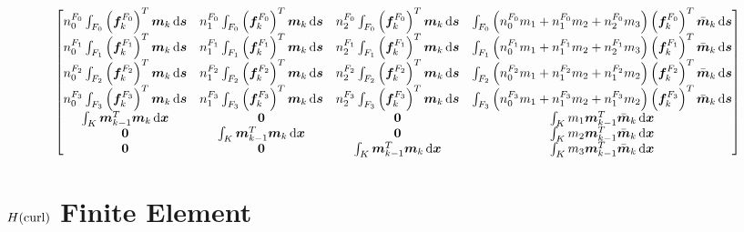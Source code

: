 \documentclass{article}
\begin{document}
\begin{align*}
    \begin{bmatrix}
        n_{0}^{F_0} \int_{F_0} \left({\boldsymbol f}_{k}^{F_0}\right)^T{\boldsymbol m}_{k}\,\mathrm d{\boldsymbol s} & 
        n_{1}^{F_0} \int_{F_0} \left({\boldsymbol f}_{k}^{F_0}\right)^T{\boldsymbol m}_{k}\,\mathrm d{\boldsymbol s} & 
        n_{2}^{F_0} \int_{F_0} \left({\boldsymbol f}_{k}^{F_0}\right)^T{\boldsymbol m}_{k}\,\mathrm d{\boldsymbol s} & 
        \int_{F_0} 
        \left(n_{0}^{F_0}m_1 + n_{1}^{F_0} m_2 + n_{2}^{F_0} m_3\right)
        \left({\boldsymbol f}_{k}^{F_0}\right)^T\bar{{\boldsymbol m}}_{k}\,\mathrm d{\boldsymbol s} \\ 
        n_{0}^{F_1} \int_{F_1} \left({\boldsymbol f}_{k}^{F_1}\right)^T{\boldsymbol m}_{k}\,\mathrm d{\boldsymbol s} & 
        n_{1}^{F_1} \int_{F_1} \left({\boldsymbol f}_{k}^{F_1}\right)^T{\boldsymbol m}_{k}\,\mathrm d{\boldsymbol s} & 
        n_{2}^{F_1} \int_{F_1} \left({\boldsymbol f}_{k}^{F_1}\right)^T{\boldsymbol m}_{k}\,\mathrm d{\boldsymbol s} & 
        \int_{F_1} 
        \left(n_{0}^{F_1}m_1 + n_{1}^{F_1}m_2 + n_{2}^{F_1}m_3\right)
        \left({\boldsymbol f}_{k}^{F_1}\right)^T\bar{{\boldsymbol m}}_{k}\,\mathrm d{\boldsymbol s} \\ 
        n_{0}^{F_2} \int_{F_2} \left({\boldsymbol f}_{k}^{F_2}\right)^T{\boldsymbol m}_{k}\,\mathrm d{\boldsymbol s} & 
        n_{1}^{F_2} \int_{F_2} \left({\boldsymbol f}_{k}^{F_2}\right)^T{\boldsymbol m}_{k}\,\mathrm d{\boldsymbol s} & 
        n_{2}^{F_2} \int_{F_2} \left({\boldsymbol f}_{k}^{F_2}\right)^T{\boldsymbol m}_{k}\,\mathrm d{\boldsymbol s} & 
        \int_{F_2} 
        \left(n_{0}^{F_2}m_1 + n_{1}^{F_2}m_2 + n_{1}^{F_2}m_2\right)
        \left({\boldsymbol f}_{k}^{F_2}\right)^T\bar{{\boldsymbol m}}_{k}\,\mathrm d{\boldsymbol s} \\ 
        n_{0}^{F_3} \int_{F_3} \left({\boldsymbol f}_{k}^{F_3}\right)^T{\boldsymbol m}_{k}\,\mathrm d{\boldsymbol s} & 
        n_{1}^{F_3} \int_{F_3} \left({\boldsymbol f}_{k}^{F_3}\right)^T{\boldsymbol m}_{k}\,\mathrm d{\boldsymbol s} & 
        n_{2}^{F_3} \int_{F_3} \left({\boldsymbol f}_{k}^{F_3}\right)^T{\boldsymbol m}_{k}\,\mathrm d{\boldsymbol s} & 
        \int_{F_3} 
        \left(n_{0}^{F_3}m_1 + n_{1}^{F_3}m_2 + n_{1}^{F_3}m_2\right)
        \left({\boldsymbol f}_{k}^{F_3}\right)^T\bar{{\boldsymbol m}}_{k}\,\mathrm d{\boldsymbol s} \\ 
        \int_{K} {\boldsymbol m}_{k-1}^T{\boldsymbol m}_{k}\,\mathrm d{\boldsymbol x} & \mathbf 0 &  \mathbf 0 & 
        \int_{K} m_1{\boldsymbol m}_{k-1}^T\bar{{\boldsymbol m}}_{k} \,\mathrm d{\boldsymbol x} \\ 
        \mathbf 0 & \int_{K} {\boldsymbol m}_{k-1}^T{\boldsymbol m}_{k}\,\mathrm d{\boldsymbol x} & \mathbf 0 & 
        \int_{K} m_2{\boldsymbol m}_{k-1}^T\bar{{\boldsymbol m}}_{k} \,\mathrm d{\boldsymbol x} \\ 
        \mathbf 0 & \mathbf 0 & \int_{K} {\boldsymbol m}_{k-1}^T{\boldsymbol m}_{k}\,\mathrm d{\boldsymbol x} &  
        \int_{K} m_3{\boldsymbol m}_{k-1}^T\bar{{\boldsymbol m}}_{k} \,\mathrm d{\boldsymbol x} \\ 
    \end{bmatrix}
\end{align*}

\section{$H(\operatorname{curl})$ Finite Element}
\end{document}
